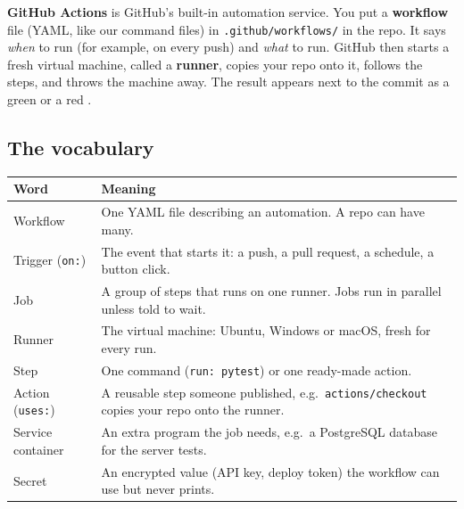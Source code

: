 \documentclass[11pt,a4paper]{article}
\begin{document}
\noindent \textbf{GitHub Actions} is GitHub's built-in automation service. You put a
\textbf{workflow} file (YAML, like our command files) in \texttt{.github/workflows/} in the repo.
It says \emph{when} to run (for example, on every push) and \emph{what} to run. GitHub then starts
a fresh virtual machine, called a \textbf{runner}, copies your repo onto it, follows the steps,
and throws the machine away. The result appears next to the commit as a green \checkmark{} or a
red \texttimes.

\begin{center}
\end{center}

\subsection{The vocabulary}
\begin{center}
\renewcommand{\arraystretch}{1.15}
\begin{tabularx}{\textwidth}{l X}
\toprule
\textbf{Word} & \textbf{Meaning} \\
\midrule
Workflow & One YAML file describing an automation. A repo can have many. \\
Trigger (\texttt{on:}) & The event that starts it: a push, a pull request, a schedule, a button click. \\
Job & A group of steps that runs on one runner. Jobs run in parallel unless told to wait. \\
Runner & The virtual machine: Ubuntu, Windows or macOS, fresh for every run. \\
Step & One command (\texttt{run: pytest}) or one ready-made action. \\
Action (\texttt{uses:}) & A reusable step someone published, e.g.\ \texttt{actions/checkout} copies your repo onto the runner. \\
Service container & An extra program the job needs, e.g.\ a PostgreSQL database for the server tests. \\
Secret & An encrypted value (API key, deploy token) the workflow can use but never prints. \\
\bottomrule
\end{tabularx}
\end{center}
\end{document}
